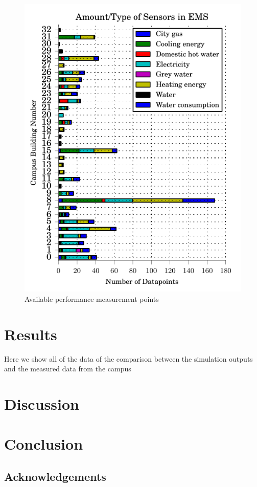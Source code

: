 \documentclass{tBPS2e}
\theoremstyle{plain}
\theoremstyle{definition}
\theoremstyle{remark}
\begin{document}
\begin{figure}
\centering
\includegraphics[scale=1.0]{figures/pointbreakdown_anon}
\caption{Available performance measurement points}
\label{fig:pointgraph}
\end{figure}

\section{Results}
{\color{red}Here we show all of the data of the comparison between the simulation outputs and the measured data from the campus}

\section{Discussion}


\section{Conclusion}

\subsection{Acknowledgements}





\end{document}
